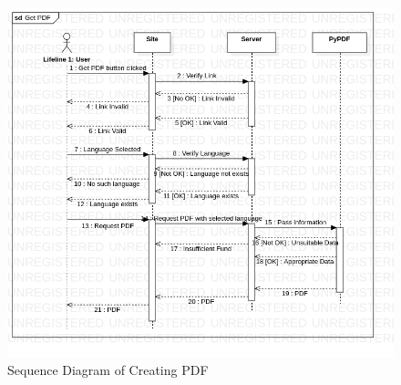 \begin{center}
    ~\\~\\~\\
    \begin{figure}[H]
        \begin{center}
            \includegraphics[scale = 0.5]{assets/SequenceDiagram.png}
            \caption[Sequence Diagram of Creating PDF]{Sequence Diagram of Creating PDF}
        \end{center}
    \end{figure}
    ~\\~\\~\\


\end{center}
